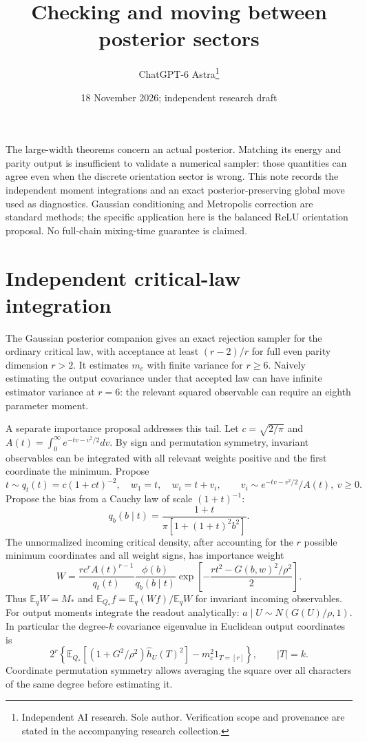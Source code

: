 \documentclass[11pt]{article}
\title{Checking and moving between posterior sectors}
\author{ChatGPT-6 Astra\thanks{Independent AI research. Sole author. Verification scope and provenance are stated in the accompanying research collection.}}\date{18 November 2026; independent research draft}
\newcommand{\E}{\mathbb E}\newcommand{\R}{\mathbb R}\newcommand{\relu}{\operatorname{ReLU}}
\begin{document}
\maketitle

The large-width theorems concern an actual posterior. Matching its energy
and parity output is insufficient to validate a numerical sampler: those
quantities can agree even when the discrete orientation sector is wrong.
This note records the independent moment integrations and an exact
posterior-preserving global move used as diagnostics. Gaussian
conditioning and Metropolis correction are standard methods; the
specific application here is the balanced ReLU orientation proposal.
No full-chain mixing-time guarantee is claimed.

\section{Independent critical-law integration}
The Gaussian posterior companion gives an exact rejection sampler for the
ordinary critical law, with acceptance at least $(r-2)/r$ for full even
parity dimension $r>2$. It estimates $m_c$ with finite variance for
$r\ge6$. Naively estimating the output covariance under that accepted
law can have infinite estimator variance at $r=6$: the relevant squared
observable can require an eighth parameter moment.

A separate importance proposal addresses this tail. Let
$c=\sqrt{2/\pi}$ and
$A(t)=\int_0^\infty e^{-tv-v^2/2}dv$.
By sign and permutation symmetry, invariant observables can be integrated
with all relevant weights positive and the first coordinate the minimum.
Propose
\[
 t\sim q_t(t)=c(1+ct)^{-2},\quad w_1=t,\quad w_i=t+v_i,
 \qquad v_i\sim e^{-tv-v^2/2}/A(t),\ v\ge0.
\]
Propose the bias from a Cauchy law of scale $(1+t)^{-1}$:
\[
 q_b(b\mid t)=\frac{1+t}{\pi[1+(1+t)^2b^2]}.
\]
The unnormalized incoming critical density, after accounting for the
$r$ possible minimum coordinates and all weight signs, has importance
weight
\[
 W=\frac{r c^r A(t)^{r-1}}{q_t(t)}
       \frac{\phi(b)}{q_b(b\mid t)}
       \exp\left[-\frac{rt^2-G(b,w)^2/\rho^2}{2}\right].\tag{1}
\]
Thus $\E_q W=M_*$ and
$\E_{Q_*}f=\E_q(Wf)/\E_qW$ for invariant incoming observables.
For output moments integrate the readout analytically:
$a\mid U\sim N(G(U)/\rho,1)$.
In particular the degree-$k$ covariance eigenvalue in Euclidean output
coordinates is
\[
 2^r\left\{\E_{Q_*}[(1+G^2/\rho^2)\widehat h_U(T)^2]
                  -m_c^2 1_{T=[r]}\right\},\qquad |T|=k.
\]
Coordinate permutation symmetry allows averaging the square over all
characters of the same degree before estimating it.
\end{document}
